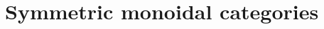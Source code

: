 \documentclass{amsart}
\def\tn{\textnormal}
\def\mc{\mathcal}
\def\Hom{\tn{Hom}}
\def\Ob{\tn{Ob}}
\def\to{\rightarrow}
\def\taking{\colon}
\def\iso{\cong}
\newcommand{\To}[1]{\xrightarrow{#1}}
\def\id{\tn{id}}
\def\Set{{\bf Set}}
\def\mcM{\mc{M}}
\def\mcN{\mc{N}}
\def\mcO{\mc{O}}
\def\mcS{\mc{S}}
\newcommand{\inp}[1]{{#1_-}}
\newcommand{\outp}[1]{{#1_+}}
\def\Int{\tn{Int}}
\newtheorem{lemma}[subsubsection]{Lemma}
\theoremstyle{remark}
\theoremstyle{definition}
\begin{document}
\section{Symmetric monoidal categories}
%
%
%
%
%
%
%
%
%
%
%
\end{document}

